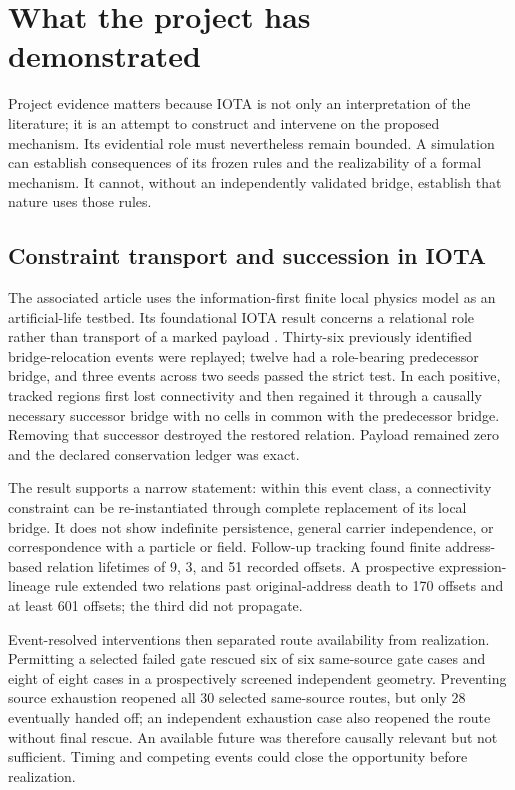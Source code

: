 \section{What the project has demonstrated}

Project evidence matters because IOTA is not only an interpretation of the
literature; it is an attempt to construct and intervene on the proposed
mechanism. Its evidential role must nevertheless remain bounded. A simulation
can establish consequences of its frozen rules and the realizability of a
formal mechanism. It cannot, without an independently validated bridge,
establish that nature uses those rules.

\subsection{Constraint transport and succession in IOTA}

The associated article uses the information-first finite local physics model as
an artificial-life testbed. Its foundational IOTA result concerns a relational
role rather than transport of a marked payload
\citep{Clark2026IotaConstraint}. Thirty-six previously identified
bridge-relocation events were replayed; twelve had a role-bearing predecessor
bridge, and three events across two seeds passed the strict test. In
each positive, tracked regions first lost connectivity and then regained it
through a causally necessary successor bridge with no cells in common with the
predecessor bridge. Removing that successor destroyed the restored relation.
Payload remained zero and the declared conservation ledger was exact.

The result supports a narrow statement: within this event class, a connectivity
constraint can be re-instantiated through complete replacement of its local
bridge. It does not show indefinite persistence, general carrier independence,
or correspondence with a particle or field. Follow-up tracking found finite
address-based relation lifetimes of 9, 3, and 51 recorded offsets. A prospective
expression-lineage rule extended two relations past original-address death to
170 offsets and at least 601 offsets; the third did not propagate.

Event-resolved interventions then separated route availability from
realization. Permitting a selected failed gate rescued six of six same-source
gate cases and eight of eight cases in a prospectively screened independent
geometry. Preventing source exhaustion reopened all 30 selected same-source
routes, but only 28 eventually handed off; an independent exhaustion case also
reopened the route without final rescue. An available future was therefore
causally relevant but not sufficient. Timing and competing events could close
the opportunity before realization.

